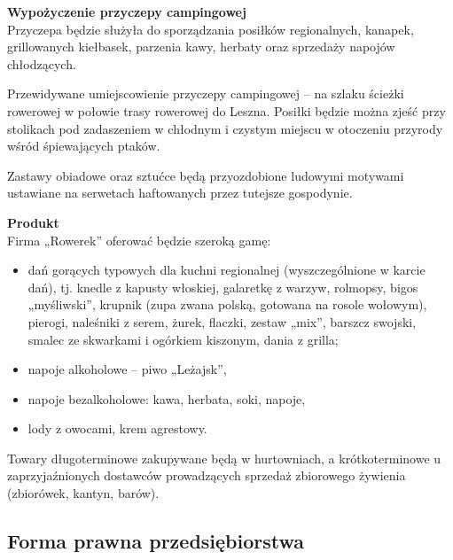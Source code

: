 \documentclass{sprawozdanie-agh}
\begin{document}
		\textbf{Wypożyczenie przyczepy campingowej}\\
		Przyczepa będzie służyła do sporządzania posiłków regionalnych, kanapek, grillowanych kiełbasek, parzenia kawy, herbaty oraz sprzedaży napojów chłodzących.
		
		Przewidywane umiejscowienie przyczepy campingowej – na szlaku ścieżki rowerowej w połowie trasy rowerowej do Leszna. Posiłki będzie można zjeść przy stolikach pod zadaszeniem w chłodnym i czystym miejscu w otoczeniu przyrody wśród śpiewających ptaków.
		
		Zastawy obiadowe oraz sztućce będą przyozdobione ludowymi motywami ustawiane na serwetach haftowanych przez tutejsze gospodynie.
		
		\textbf{Produkt}\\
		Firma „Rowerek” oferować będzie szeroką gamę:
		\begin{itemize}
			\item dań gorących typowych dla kuchni regionalnej (wyszczególnione w karcie dań), tj. knedle z kapusty włoskiej, galaretkę z warzyw, rolmopsy, bigos „myśliwski”, krupnik (zupa zwana polską, gotowana na rosole wołowym),  pierogi, naleśniki  z serem, żurek, flaczki, zestaw „mix”, barszcz swojski, smalec ze skwarkami i ogórkiem kiszonym, dania z grilla;
			\item napoje alkoholowe – piwo „Leżajsk”,
			\item napoje bezalkoholowe: kawa, herbata, soki, napoje,
			\item lody z owocami, krem agrestowy.
		\end{itemize}
		Towary długoterminowe zakupywane będą w hurtowniach, a krótkoterminowe u zaprzyjaźnionych dostawców prowadzących sprzedaż zbiorowego żywienia (zbiorówek, kantyn, barów).

		\subsection{Forma prawna przedsiębiorstwa}
\end{document}
